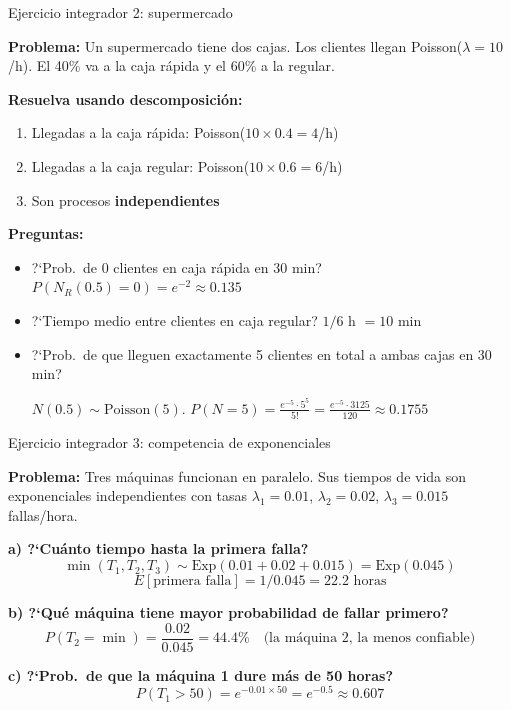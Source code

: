 \documentclass[aspectratio=1610, 9pt]{beamer}
\begin{document}
\begin{frame}{Ejercicio integrador 2: supermercado}

\textbf{Problema:} Un supermercado tiene dos cajas. Los clientes llegan Poisson($\lambda = 10$/h). El 40\% va a la caja r\'{a}pida y el 60\% a la regular.

\vspace{0.3cm}
\textbf{Resuelva usando descomposici\'{o}n:}
\begin{enumerate}
    \item Llegadas a la caja r\'{a}pida: Poisson($10 \times 0.4 = 4$/h)
    \item Llegadas a la caja regular: Poisson($10 \times 0.6 = 6$/h)
    \item Son procesos \textbf{independientes}
\end{enumerate}

\vspace{0.3cm}
\textbf{Preguntas:}
\begin{itemize}
    \item ?`Prob.\ de 0 clientes en caja r\'{a}pida en 30 min? $P(N_R(0.5)=0) = e^{-2} \approx 0.135$

    \item ?`Tiempo medio entre clientes en caja regular? $1/6$ h $= 10$ min

    \item ?`Prob.\ de que lleguen exactamente 5 clientes en total a ambas cajas en 30 min?

    $N(0.5) \sim \text{Poisson}(5)$. $P(N=5) = \frac{e^{-5}\cdot 5^5}{5!} = \frac{e^{-5}\cdot 3125}{120} \approx 0.1755$
\end{itemize}
\end{frame}

\begin{frame}{Ejercicio integrador 3: competencia de exponenciales}

\textbf{Problema:} Tres m\'{a}quinas funcionan en paralelo. Sus tiempos de vida son exponenciales independientes con tasas $\lambda_1 = 0.01$, $\lambda_2 = 0.02$, $\lambda_3 = 0.015$ fallas/hora.

\vspace{0.3cm}
\textbf{a) ?`Cu\'{a}nto tiempo hasta la primera falla?}
\[
\min(T_1,T_2,T_3) \sim \text{Exp}(0.01+0.02+0.015) = \text{Exp}(0.045)
\]
\[
E[\text{primera falla}] = 1/0.045 = 22.2 \text{ horas}
\]

\textbf{b) ?`Qu\'{e} m\'{a}quina tiene mayor probabilidad de fallar primero?}
\[
P(T_2 = \min) = \frac{0.02}{0.045} = 44.4\% \quad \text{(la m\'{a}quina 2, la menos confiable)}
\]

\textbf{c) ?`Prob.\ de que la m\'{a}quina 1 dure m\'{a}s de 50 horas?}
\[
P(T_1 > 50) = e^{-0.01 \times 50} = e^{-0.5} \approx 0.607
\]
\end{frame}
\end{document}
